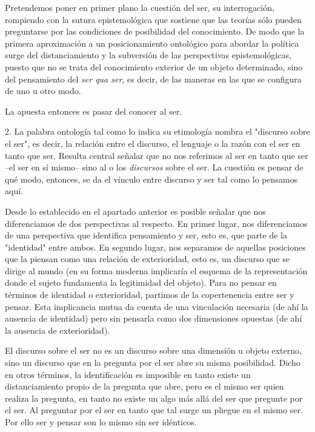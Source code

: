\documentclass{book}
\begin{document}
Pretendemos poner en primer plano la cuestión del ser, su interrogación,
rompiendo con la sutura epistemológica que sostiene que las teorías sólo
pueden preguntarse por las condiciones de posibilidad del conocimiento.
De modo que la primera aproximación a un posicionamiento ontológico para
abordar la política surge del distanciamiento y la subversión de las
perspectivas epistemológicas, puesto que no se trata del conocimiento
exterior de un objeto determinado, sino del pensamiento del \emph{ser
qua ser}, es decir, de las maneras en las que se configura de uno u otro
modo.

La apuesta entonces es pasar del conocer al ser.

2. La palabra ontología tal como lo indica su etimología nombra el
"discurso sobre el ser", es decir, la relación entre el discurso, el
lenguaje o la razón con el ser en tanto que ser. Resulta central señalar
que no nos referimos al ser en tanto que ser --el ser en sí mismo-- sino
al o los \emph{discursos} sobre el ser. La cuestión es pensar de qué
modo, entonces, se da el vínculo entre discurso y ser tal como lo
pensamos aquí.

Desde lo establecido en el apartado anterior es posible señalar que nos
diferenciamos de dos perspectivas al respecto. En primer lugar, nos
diferenciamos de una perspectiva que identifica pensamiento y ser, esto
es, que parte de la "identidad" entre ambos. En segundo lugar, nos
separamos de aquellas posiciones que la piensan como una relación de
exterioridad, esto es, un discurso que se dirige al mundo (en su forma
moderna implicaría el esquema de la representación donde el sujeto
fundamenta la legitimidad del objeto). Para no pensar en términos de
identidad o exterioridad, partimos de la copertenencia entre ser y
pensar. Esta implicancia mutua da cuenta de una vinculación necesaria
(de ahí la ausencia de identidad) pero sin pensarla como dos dimensiones
opuestas (de ahí la ausencia de exterioridad).

El discurso sobre el ser no es un discurso sobre una dimensión u objeto
externo, sino un discurso que en la pregunta por el ser abre su misma
posibilidad. Dicho en otros términos, la identificación es imposible en
tanto existe un distanciamiento propio de la pregunta que abre, pero es
el mismo ser quien realiza la pregunta, en tanto no existe un algo más
allá del ser que pregunte por el ser. Al preguntar por el ser en tanto
que tal surge un pliegue en el mismo ser. Por ello ser y pensar son lo
mismo sin ser idénticos.
\end{document}
